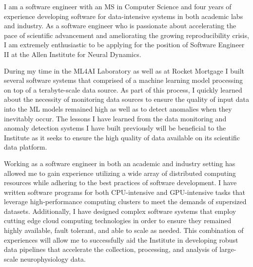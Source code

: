 


I am a software engineer with an MS in Computer Science and four years of experience developing software for data-intensive systems in both academic labs and industry.
As a software engineer who is passionate about accelerating the pace of scientific advancement and ameliorating the growing reproducibility crisis, I am extremely enthusiastic to be applying for the position of Software Engineer II at the Allen Institute for Neural Dynamics.

During my time in the ML4AI Laboratory as well as at Rocket Mortgage I built several software systems that comprised of a machine learning model processing on top of a terabyte-scale data source.
As part of this process, I quickly learned about the necessity of monitoring data sources to ensure the quality of input data into the ML models remained high as well as to detect anomalies when they inevitably occur.
The lessons I have learned from the data monitoring and anomaly detection systems I have built previously will be beneficial to the Institute as it seeks to ensure the high quality of data available on its scientific data platform.

Working as a software engineer in both an academic and industry setting has allowed me to gain experience utilizing a wide array of distributed computing resources while adhering to the best practices of software development.
I have written software programs for both CPU-intensive and GPU-intensive tasks that leverage high-performance computing clusters to meet the demands of supersized datasets.
Additionally, I have designed complex software systems that employ cutting edge cloud computing technologies in order to ensure they remained highly available, fault tolerant, and able to scale as needed.
This combination of experiences will allow me to successfully aid the Institute in developing robust data pipelines that accelerate the collection, processing, and analysis of large-scale neurophysiology data.

